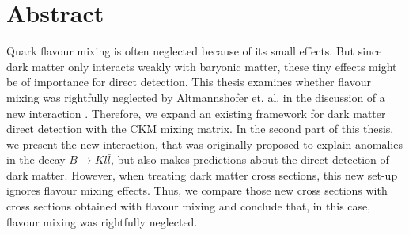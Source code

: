 \thispagestyle{plain}
\section*{Abstract}
Quark flavour mixing is often neglected because of its small effects. But since dark matter only interacts weakly with baryonic matter, these tiny effects might be of importance for direct detection. This thesis examines whether flavour mixing was rightfully neglected by Altmannshofer et. al. in the discussion of a new interaction \cite{Z}. Therefore, we expand an existing framework for dark matter direct detection with the CKM mixing matrix. In the second part of this thesis, we present the new interaction, that was originally proposed to explain anomalies in the decay $B\rightarrow Kl\bar{l}$, but also makes predictions about the direct detection of dark matter. However, when treating dark matter cross sections, this new set-up ignores flavour mixing effects. Thus, we compare those new cross sections with cross sections obtained with flavour mixing and conclude that, in this case, flavour mixing was rightfully neglected.